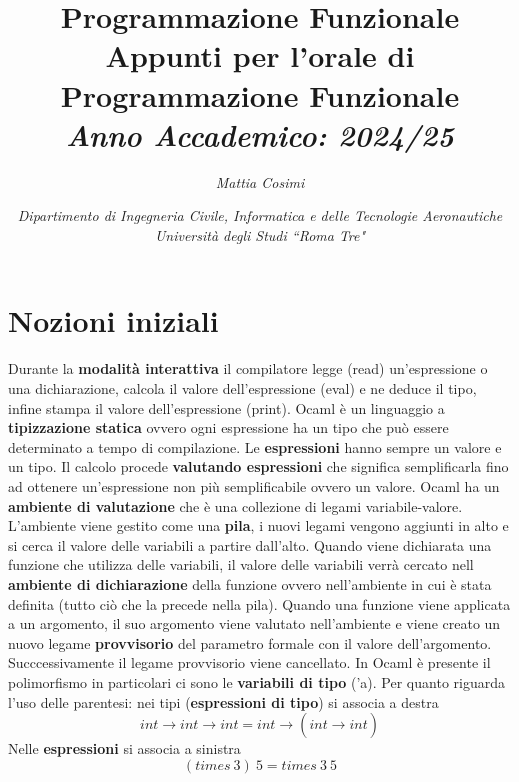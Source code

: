 \documentclass{article}
\numberwithin{equation}{subsection}
\begin{document}
\title{%
    \textbf{Programmazione Funzionale}  \\ 
    \large Appunti per l'orale di Programmazione Funzionale\\
    \textit{Anno Accademico: 2024/25}}
\author{\textit{Mattia Cosimi}}
\date{\textit{Dipartimento di Ingegneria Civile, Informatica e delle Tecnologie Aeronautiche \\
Università degli Studi ``Roma Tre"}}

\maketitle


\clearpage

\pagestyle{fancy}
\fancyhead{}\fancyfoot{}
\fancyfoot[C]{\thepage}

\tableofcontents

\clearpage


\section{Nozioni iniziali}
Durante la \textbf{modalità interattiva} il compilatore legge (read) un'espressione o una dichiarazione, calcola il valore dell'espressione (eval) e ne deduce il tipo, infine stampa il valore dell'espressione (print). Ocaml è un linguaggio a \textbf{tipizzazione statica} ovvero ogni espressione ha un tipo che può essere determinato a tempo di compilazione. Le \textbf{espressioni} hanno sempre un valore e un tipo. Il calcolo procede \textbf{valutando espressioni} che significa semplificarla fino ad ottenere un'espressione non più semplificabile ovvero un valore. Ocaml ha un \textbf{ambiente di valutazione} che è una collezione di legami variabile-valore. L'ambiente viene gestito come una \textbf{pila}, i nuovi legami vengono aggiunti in alto e si cerca il valore delle variabili a partire dall'alto. Quando viene dichiarata una funzione che utilizza delle variabili, il valore delle variabili verrà cercato nell \textbf{ambiente di dichiarazione} della funzione ovvero nell'ambiente in cui è stata definita (tutto ciò che la precede nella pila). Quando una funzione viene applicata a un argomento, il suo argomento viene valutato nell'ambiente e viene creato un nuovo legame \textbf{provvisorio} del parametro formale con il valore dell'argomento. Succcessivamente il legame provvisorio viene cancellato. In Ocaml è presente il polimorfismo in particolari ci sono le \textbf{variabili di tipo} ('a). Per quanto riguarda l'uso delle parentesi: nei tipi (\textbf{espressioni di tipo}) si associa a destra
$$int\xrightarrow[]{}int\xrightarrow{}int=int\xrightarrow[]{}(int\xrightarrow[]{}int)$$
Nelle \textbf{espressioni} si associa a sinistra
$$(times\ 3) \ 5 = times \ 3 \ 5$$
\end{document}
